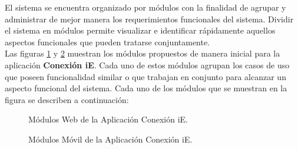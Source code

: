 
	El sistema se encuentra organizado por módulos con la finalidad de agrupar y administrar de mejor manera los requerimientos funcionales del sistema. Dividir el sistema en módulos permite visualizar e identificar rápidamente aquellos aspectos funcionales que pueden tratarse conjuntamente. \\

    Las figuras \ref{fig:ModulosWeb} y \ref{fig:ModulosMovil} muestran los módulos propuestos de manera inicial para la aplicación \textbf{Conexión iE}. Cada uno de estos módulos agrupan los casos de uso que poseen funcionalidad similar o que trabajan en conjunto para alcanzar un aspecto funcional del sistema. Cada uno de los módulos que se muestran en la figura se describen a continuación:


    \begin{figure}[h!]
	\begin{center}
	\caption{Módulos Web de la Aplicación Conexión iE.}
	\label{fig:ModulosWeb}
	\end{center}
    \end{figure}

    \begin{figure}[h!]
	\begin{center}
		\caption{Módulos Móvil de la Aplicación Conexión iE.}
		\label{fig:ModulosMovil}
	\end{center}
\end{figure}


